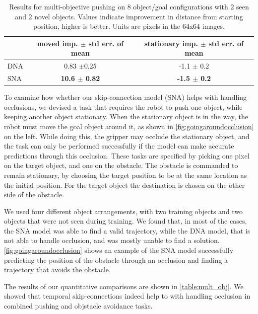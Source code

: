 \begin{table}
\centering
{\footnotesize
\begin{tabular}{lcc}
	\toprule
         &  \thead{moved imp. \\ $\pm$ std err. of mean} &   \thead{stationary imp. \\ $\pm$ std err. of mean}  \\
         \midrule
  DNA \cite{foresight} & 0.83 $\pm$0.25 &  -1.1 $\pm$ 0.2\\ 
  SNA & \textbf{10.6 $\pm$ 0.82} & \textbf{-1.5 $\pm$ 0.2} \\
  \bottomrule
\end{tabular}
}
\caption{Results for multi-objective pushing on 8 object/goal configurations with 2 seen and 2 novel objects. Values indicate improvement in distance from starting position, higher is better. Units are pixels in the 64x64 images.} 
\label{table:mult_obj}
\end{table}

To examine how whether our skip-connection model (SNA) helps with handling occlusions, we devised a task that requires the robot to push one object, while keeping another object stationary. When the stationary object is in the way, the robot must move the goal object around it, as shown in \autoref{fig:goingaroundocclusion} on the left. While doing this, the gripper may occlude the stationary object, and the task can only be performed successfully if the model can make accurate predictions through this occlusion. These tasks are specified by picking one pixel on the target object, and one on the obstacle. The obstacle is commanded to remain stationary, by choosing the target position to be at the same location as the initial position. For the target object the destination is chosen on the other side of the obstacle.

We used four different object arrangements, with two training objects and two objects that were not seen during training. We found that, in most of the cases, the SNA model was able to find a valid trajectory, while the DNA model, that is not able to handle occlusion, and was mostly unable to find a solution. \autoref{fig:goingaroundocclusion} shows an example of the SNA model successfully predicting the position of the obstacle through an occlusion and finding a trajectory that avoids the obstacle. 

The results of our quantitative comparisons are shown in \autoref{table:mult_obj}. We showed that temporal skip-connections indeed help to with handling occlusion in combined pushing and objstacle avoidance tasks.

